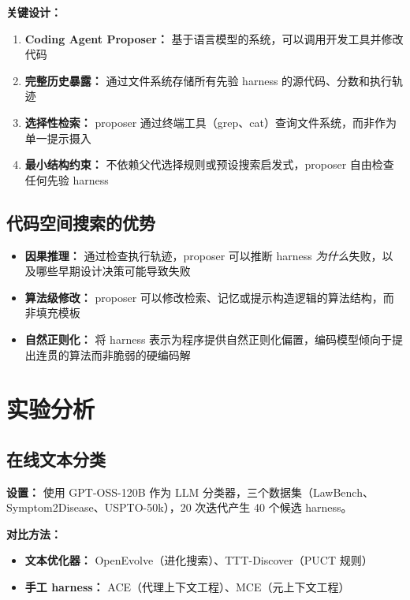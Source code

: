 \documentclass[12pt,a4paper]{article}
\begin{document}
\textbf{关键设计：}
\begin{enumerate}
    \item \textbf{Coding Agent Proposer：} 基于语言模型的系统，可以调用开发工具并修改代码
    \item \textbf{完整历史暴露：} 通过文件系统存储所有先验 harness 的源代码、分数和执行轨迹
    \item \textbf{选择性检索：} proposer 通过终端工具（grep、cat）查询文件系统，而非作为单一提示摄入
    \item \textbf{最小结构约束：} 不依赖父代选择规则或预设搜索启发式，proposer 自由检查任何先验 harness
\end{enumerate}

\subsection{代码空间搜索的优势}

\begin{itemize}
    \item \textbf{因果推理：} 通过检查执行轨迹，proposer 可以推断 harness \textit{为什么}失败，以及哪些早期设计决策可能导致失败
    \item \textbf{算法级修改：} proposer 可以修改检索、记忆或提示构造逻辑的算法结构，而非填充模板
    \item \textbf{自然正则化：} 将 harness 表示为程序提供自然正则化偏置，编码模型倾向于提出连贯的算法而非脆弱的硬编码解
\end{itemize}

\section{实验分析}

\subsection{在线文本分类}

\textbf{设置：} 使用 GPT-OSS-120B 作为 LLM 分类器，三个数据集（LawBench、Symptom2Disease、USPTO-50k），20 次迭代产生 40 个候选 harness。

\textbf{对比方法：}
\begin{itemize}
    \item \textbf{文本优化器：} OpenEvolve（进化搜索）、TTT-Discover（PUCT 规则）
    \item \textbf{手工 harness：} ACE（代理上下文工程）、MCE（元上下文工程）
\end{itemize}
\end{document}
